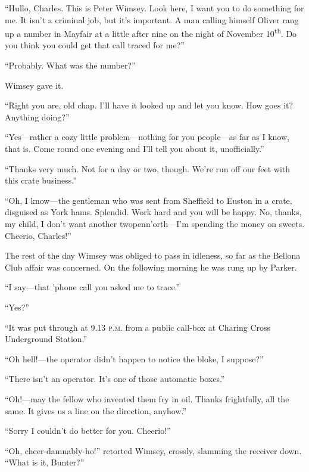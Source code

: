 \enquote{Hullo, Charles. This is Peter Wimsey. Look here, I want you to do something for me. It isn't a criminal job, but it's important. A man calling himself Oliver rang up a number in Mayfair at a little after nine on the night of November  10\textsuperscript{th}. Do you think you could get that call traced for me?}

\enquote{Probably. What was the number?}

Wimsey gave it.

\enquote{Right you are, old chap. I'll have it looked up and let you know. How goes it? Anything doing?}

\enquote{Yes\allowbreak---\allowbreak rather a cozy little problem\allowbreak---\allowbreak nothing for you people\allowbreak---\allowbreak as far as I know, that is. Come round one evening and I'll tell you about it, unofficially.}

\enquote{Thanks very much. Not for a day or two, though. We're run off our feet with this crate business.}

\enquote{Oh, I know\allowbreak---\allowbreak the gentleman who was sent from Sheffield to Euston in a crate, disguised as York hams. Splendid. Work hard and you will be happy. No, thanks, my child, I don't want another twopenn'orth\allowbreak---\allowbreak I'm spending the money on sweets. Cheerio, Charles!}

The rest of the day Wimsey was obliged to pass in idleness, so far as the Bellona Club affair was concerned. On the following morning he was rung up by Parker.

\enquote{I say\allowbreak---\allowbreak that 'phone call you asked me to trace.}

\enquote{Yes?}

\enquote{It was put through at 9.13 \textsc{p.m.} from a public call-box at Charing Cross Underground Station.}

\enquote{Oh hell!---the operator didn't happen to notice the bloke, I suppose?}

\enquote{There isn't an operator. It's one of those automatic boxes.}

\enquote{Oh!---may the fellow who invented them fry in oil. Thanks frightfully, all the same. It gives us a line on the direction, anyhow.}

\enquote{Sorry I couldn't do better for you. Cheerio!}

\enquote{Oh, cheer-damnably-ho!} retorted Wimsey, crossly, slamming the receiver down. \enquote{What is it, Bunter?}

